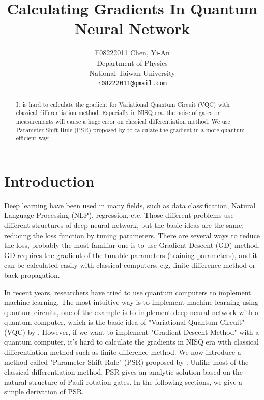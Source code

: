 \documentclass{article}
\title{Calculating Gradients In Quantum Neural Network}
\author{F08222011 Chen, Yi-An\\
	Department of Physics\\
	National Taiwan University\\
	\texttt{r08222011@gmail.com} \\
}
\date{}
\begin{document}
\maketitle

\begin{abstract}
    
    It is hard to calculate the gradient for Variational Quantum Circuit (VQC) with classical differentiation method. Especially in NISQ era, the noise of gates or measurements will cause a huge error on classical differentiation method. We use Parameter-Shift Rule (PSR) proposed by \citet{1905.13311} to calculate the gradient in a more quantum-efficient way. 
    
\end{abstract}




\section{Introduction}
Deep learning have been used in many fields, such as data classification, Natural Language Processing (NLP), regression, etc. Those different problems use different structures of deep neural network, but the basic ideas are the same: reducing the loss function by tuning parameters. There are several ways to reduce the loss, probably the most familiar one is to use Gradient Descent (GD) method. GD requires the gradient of the tunable parameters (training parameters), and it can be calculated easily with classical computers, e.g. finite difference method or back propagation.

In recent years, researchers have tried to use quantum computers to implement machine learning. The most intuitive way is to implement machine learning using quantum circuits, one of the example is to implement deep neural network with a quantum computer, which is the basic idea of "Variational Quantum Circuit" (VQC) by \citet{VQE}. However, if we want to implement "Gradient Descent Method" with a quantum computer, it's hard to calculate the gradients in NISQ era with classical differentiation method such as finite difference method. We now introduce a method called "Parameter-Shift Rule" (PSR) proposed by \citet{1905.13311}. Unlike most of the classical differentiation method, PSR gives an analytic solution based on the natural structure of Pauli rotation gates. In the following sections, we give a simple derivation of PSR.
\end{document}
